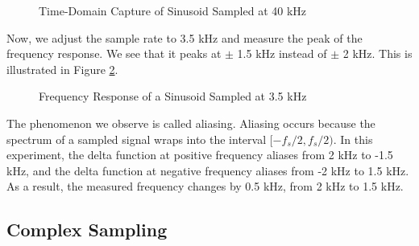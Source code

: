 \documentclass{article}
\begin{document}
\begin{figure}[H]
	\centerline{}
	\caption{Time-Domain Capture of Sinusoid Sampled at 40 kHz}
	\label{fig::sampling_rates_time_domain_40k_samp_rate}
\end{figure}

Now, we adjust the sample rate to 3.5 kHz and measure the peak of the frequency response. We see that it peaks at $\pm$ 1.5 kHz instead of $\pm$ 2 kHz. This is illustrated in Figure \ref{fig::sampling_rates_freq_domain_3_5k_samp_rate}.

\begin{figure}[H]
	\centerline{}
	\caption{Frequency Response of a Sinusoid Sampled at 3.5 kHz}
	\label{fig::sampling_rates_freq_domain_3_5k_samp_rate}
\end{figure}

The phenomenon we observe is called aliasing. Aliasing occurs because the spectrum of a sampled signal wraps into the interval $[-f_s/2, f_s/2)$. In this experiment, the delta function at positive frequency aliases from 2 kHz to -1.5 kHz, and the delta function at negative frequency aliases from -2 kHz to 1.5 kHz. As a result, the measured frequency changes by 0.5 kHz, from 2 kHz to 1.5 kHz.

\subsection{Complex Sampling}
\end{document}

